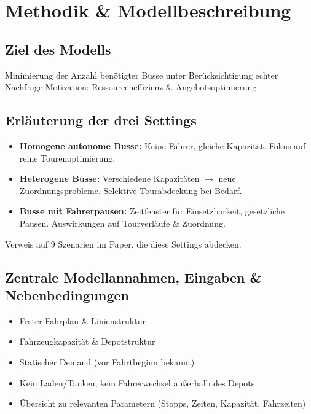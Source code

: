 \chapter{Methodik \& Modellbeschreibung}
\section{Ziel des Modells}
Minimierung der Anzahl benötigter Busse unter Berücksichtigung echter Nachfrage
Motivation: Ressourceneffizienz \& Angebotsoptimierung
\section{Erläuterung der drei Settings}
\begin{itemize}
    \item \textbf{Homogene autonome Busse:} Keine Fahrer, gleiche Kapazität. Fokus auf reine Tourenoptimierung.
    \item \textbf{Heterogene Busse:} Verschiedene Kapazitäten \(\rightarrow\) neue Zuordnungsprobleme. Selektive Tourabdeckung bei Bedarf.
    \item \textbf{Busse mit Fahrerpausen:} Zeitfenster für Einsetzbarkeit, gesetzliche Pausen. Auswirkungen auf Tourverläufe \& Zuordnung.
\end{itemize}

Verweis auf  9 Szenarien im Paper, die diese Settings abdecken.
\section{Zentrale Modellannahmen, Eingaben \& Nebenbedingungen}
\begin{itemize}
    \item Fester Fahrplan \& Linienstruktur
    \item Fahrzeugkapazität \& Depotstruktur
    \item Statischer Demand (vor Fahrtbeginn bekannt)
    \item Kein Laden/Tanken, kein Fahrerwechsel außerhalb des Depots
    \item Übersicht zu relevanten Parametern (Stopps, Zeiten, Kapazität, Fahrzeiten)
\end{itemize}
